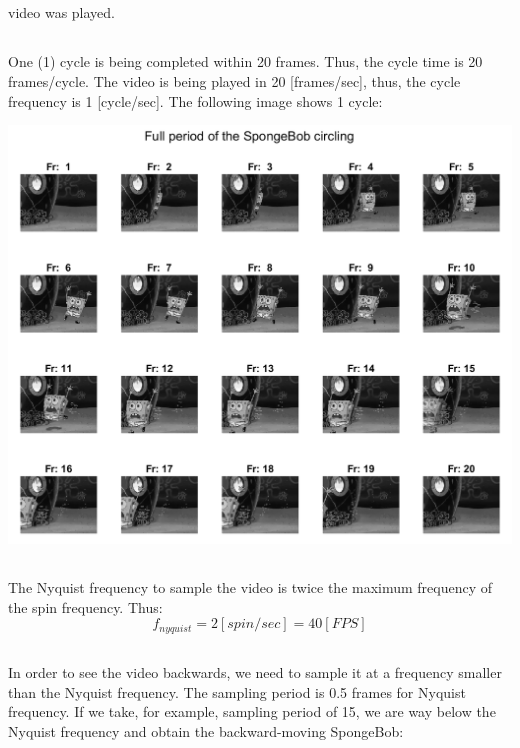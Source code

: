 \documentclass[a4paper]{iacas}
\begin{document}
\subsection{}
video was played.

\subsection{}
One (1) cycle is being completed within 20 frames. Thus, the cycle time is 20 frames/cycle. The video is being played in 20 [frames/sec], thus, the cycle frequency is 1 [cycle/sec]. The following image shows 1 cycle:

\vskip 0.1in
\begin{minipage}{1\textwidth}
\centering
	\includegraphics[scale=0.9]{../imgs/imgs_q2/sponge_period.png}
\end{minipage}
\vskip 0.1in
\subsection{}
The Nyquist frequency to sample the video is twice the maximum frequency of the spin frequency. Thus:
$$f_{nyquist} = 2 [spin/sec] = 40 [FPS]$$

\subsection{}
In order to see the video backwards, we need to sample it at a frequency smaller than the Nyquist frequency. The sampling period is 0.5 frames for Nyquist frequency. If we take, for example, sampling period of 15, we are way below the Nyquist frequency and obtain the backward-moving SpongeBob:
\end{document}
